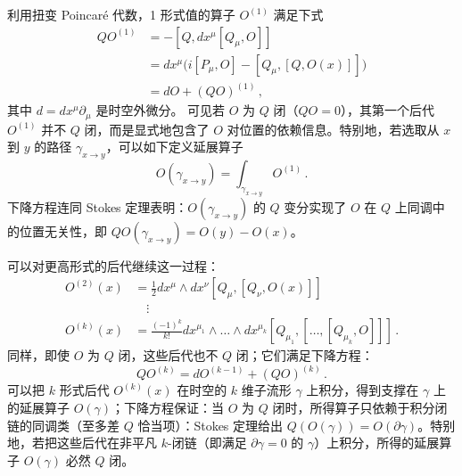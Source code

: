 利用扭变 Poincaré 代数，1 形式值的算子 $O^{(1)}$ 满足下式
\begin{equation}\tag{3.2}
\begin{aligned}
QO^{(1)} &= -[Q,dx^\mu[Q_\mu,O]]\\
&= dx^\mu\big(i[P_\mu,O] - [Q_\mu,[Q,O(x)]]\big)\\
&= dO + (QO)^{(1)}\,,
\end{aligned}
\end{equation}
其中 $d = dx^\mu\partial_\mu$ 是时空外微分。
可见若 $O$ 为 $Q$ 闭（$QO=0$），其第一个后代 $O^{(1)}$ 并不 $Q$ 闭，而是显式地包含了 $O$ 对位置的依赖信息。特别地，若选取从 $x$ 到 $y$ 的路径 $\gamma_{x\to y}$，可以如下定义延展算子
\begin{equation}\tag{3.3}
O(\gamma_{x\to y}) = \int_{\gamma_{x\to y}} O^{(1)}\,.
\end{equation}
下降方程连同 Stokes 定理表明：$O(\gamma_{x\to y})$ 的 $Q$ 变分实现了 $O$ 在 $Q$ 上同调中的位置无关性，即 $QO(\gamma_{x\to y}) = O(y)-O(x)$。

可以对更高形式的后代继续这一过程：
\begin{equation}\tag{3.4}
\begin{aligned}
O^{(2)}(x) &= \frac{1}{2}dx^\mu\wedge dx^\nu[Q_\mu,[Q_\nu,O(x)]]\\
&\quad\vdots\\
O^{(k)}(x) &= \frac{(-1)^k}{k!}dx^{\mu_1}\wedge\ldots\wedge dx^{\mu_k}
[Q_{\mu_1},[\ldots,[Q_{\mu_k},O]]]\,.
\end{aligned}
\end{equation}
同样，即使 $O$ 为 $Q$ 闭，这些后代也不 $Q$ 闭；它们满足下降方程：
\begin{equation}\tag{3.5}
QO^{(k)} = dO^{(k-1)} + (QO)^{(k)}\,.
\end{equation}
可以把 $k$ 形式后代 $O^{(k)}(x)$ 在时空的 $k$ 维子流形 $\gamma$ 上积分，得到支撑在 $\gamma$ 上的延展算子 $O(\gamma)$；下降方程保证：当 $O$ 为 $Q$ 闭时，所得算子只依赖于积分闭链的同调类（至多差 $Q$ 恰当项）：Stokes 定理给出 $Q(O(\gamma)) = O(\partial\gamma)$。特别地，若把这些后代在非平凡 $k$-闭链（即满足 $\partial\gamma=0$ 的 $\gamma$）上积分，所得的延展算子 $O(\gamma)$ 必然 $Q$ 闭。

